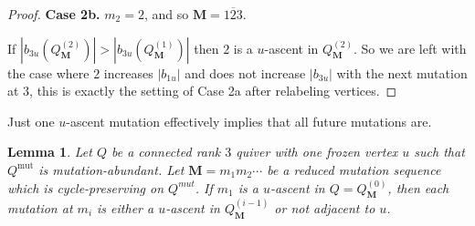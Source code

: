 \documentclass[12pt]{amsart}
\newtheorem{lem}[thm]{Lemma}
\theoremstyle{definition}
\theoremstyle{remark}
\numberwithin{equation}{section}
\newcommand{\mut} {\text{mut}}
\begin{document}
\begin{proof}
\textbf{Case 2b.} $m_2=2$, and so $\mathbf M = \overline{123}$.

If $|b_{3u}(Q^{(2)}_{\mathbf M})| > |b_{3u}(Q^{(1)}_{\mathbf M})|$ then $2$ is a $u$-ascent in $Q^{(2)}_{\mathbf M}$. 
So we are left with the case where $2$ increases $|b_{1u}|$ and does not increase $|b_{3u}|$ with the next mutation at $3$, this is exactly the setting of Case 2a after relabeling vertices.
\end{proof}

Just one $u$-ascent mutation effectively implies that all future mutations are.

\begin{lem}
\label{lem: increasing sticky}
\label{lem: increasing sticky for incomplete}
Let $Q$ be a connected rank $3$ quiver with one frozen vertex $u$ such that $Q^{\mut}$ is mutation-abundant. 
Let $\mathbf M = m_1 m_2\cdots $ be a reduced mutation sequence which is cycle-preserving on $Q^{mut}$. 
If $m_1$ is a $u$-ascent in $Q = Q_{\mathbf M}^{(0)}$, 
then each mutation at $m_i$ is either a $u$-ascent in $Q_{\mathbf M}^{(i-1)}$ or not adjacent to $u$.
\end{lem}
\end{document}

